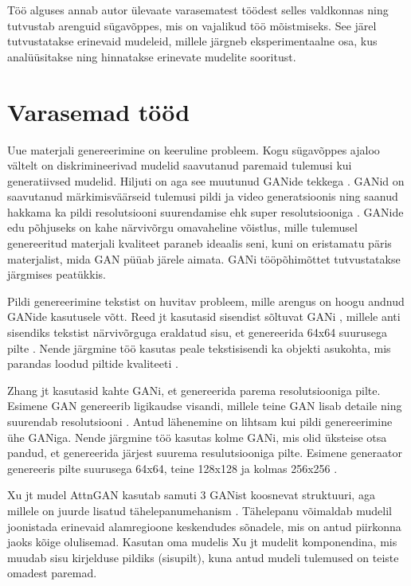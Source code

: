 \documentclass{vilgym}
\begin{document}
	Töö alguses annab autor ülevaate varasematest töödest selles valdkonnas ning tutvustab arenguid sügavõppes, mis on vajalikud töö mõistmiseks. See järel tutvustatakse erinevaid mudeleid, millele järgneb eksperimentaalne osa, kus analüüsitakse ning hinnatakse erinevate mudelite sooritust. 
	
	\section{Varasemad tööd}

	Uue materjali genereerimine on keeruline probleem. Kogu sügavõppes ajaloo vältelt on diskrimineerivad mudelid saavutanud paremaid tulemusi kui generatiivsed mudelid. Hiljuti on aga see muutunud GANide tekkega \parencite{gan}. GANid on saavutanud märkimisväärseid tulemusi pildi \parencite{biggan} ja video generatsioonis \parencite{dvdgan} ning saanud hakkama ka pildi resolutsiooni suurendamise ehk super resolutsiooniga \parencite{srgan}. GANide edu põhjuseks on kahe närvivõrgu omavaheline võistlus, mille tulemusel genereeritud materjali kvaliteet paraneb ideaalis seni, kuni on eristamatu päris materjalist, mida GAN püüab järele aimata. GANi tööpõhimõttet tutvustatakse järgmises peatükkis.

	Pildi genereerimine tekstist on huvitav probleem, mille arengus on hoogu andnud GANide kasutusele võtt. Reed jt kasutasid sisendist sõltuvat GANi , millele anti sisendiks tekstist närvivõrguga eraldatud sisu, et genereerida 64x64 suurusega pilte \parencite{reed}. Nende järgmine töö kasutas peale tekstisisendi ka objekti asukohta, mis parandas loodud piltide kvaliteeti \parencite{reed2}. 

	Zhang jt kasutasid kahte GANi, et genereerida parema resolutsiooniga pilte. Esimene GAN genereerib ligikaudse visandi, millele teine GAN lisab detaile ning suurendab resolutsiooni \parencite{stackgan}. Antud lähenemine on lihtsam kui pildi genereerimine ühe GANiga. Nende järgmine töö kasutas kolme GANi, mis olid üksteise otsa pandud, et genereerida järjest suurema resulutsiooniga pilte. Esimene generaator genereeris pilte suurusega 64x64, teine 128x128 ja kolmas 256x256 \parencite{stackgan2}.

	Xu jt mudel AttnGAN kasutab samuti 3 GANist koosnevat struktuuri, aga millele on juurde lisatud tähelepanumehanism \parencite{attngan}. Tähelepanu võimaldab mudelil joonistada erinevaid alamregioone keskendudes sõnadele, mis on antud piirkonna jaoks kõige olulisemad. Kasutan oma mudelis Xu jt mudelit komponendina, mis muudab sisu kirjelduse pildiks (sisu\textrightarrow pilt), kuna antud mudeli tulemused on teiste omadest paremad. 
\end{document}
